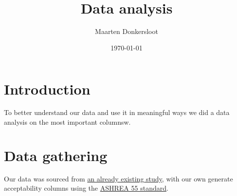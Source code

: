 \documentclass[]{article}
\begin{document}
\title {Data analysis}
\author {Maarten Donkersloot}
\date{\today}


\maketitle

\newpage

\section{Introduction}
To better understand our data and use it in meaningful ways we did a data analysis on the most important columnsw. 

\section {Data gathering}
Our data was sourced from \href{https://github.com/IoTsec/Room-Climate-Datasets}{an already existing study}, with our own generate acceptability columns using the \href{https://www.researchgate.net/figure/ASHRAE-55-limits-for-thermal-Comfort-adapted-from-ASHRAE-55-2017_fig5_327597687}{ASHREA 55 standard}.
\end{document}
